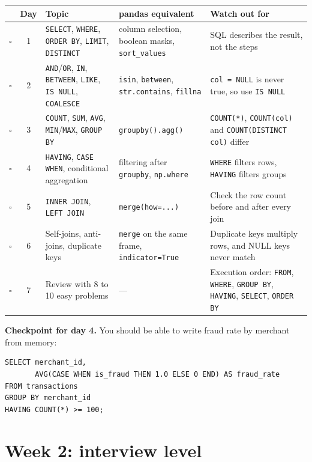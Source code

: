 \documentclass[11pt,a4paper]{article}
\newcommand{\code}[1]{\texttt{#1}}
\newcommand{\done}{$\square$}
\begin{document}
{\small
\begin{tabularx}{\textwidth}{@{}c c L L L@{}}
\toprule
 & \textbf{Day} & \textbf{Topic} & \textbf{pandas equivalent} & \textbf{Watch out for} \\
\midrule
\done & 1 & \code{SELECT}, \code{WHERE}, \code{ORDER BY}, \code{LIMIT}, \code{DISTINCT}
      & column selection, boolean masks, \code{sort\_values}
      & SQL describes the result, not the steps \\
\done & 2 & \code{AND}/\code{OR}, \code{IN}, \code{BETWEEN}, \code{LIKE}, \code{IS NULL}, \code{COALESCE}
      & \code{isin}, \code{between}, \code{str.contains}, \code{fillna}
      & \code{col = NULL} is never true, so use \code{IS NULL} \\
\done & 3 & \code{COUNT}, \code{SUM}, \code{AVG}, \code{MIN}/\code{MAX}, \code{GROUP BY}
      & \code{groupby().agg()}
      & \code{COUNT(*)}, \code{COUNT(col)} and \code{COUNT(DISTINCT col)} differ \\
\done & 4 & \code{HAVING}, \code{CASE WHEN}, conditional aggregation
      & filtering after \code{groupby}, \code{np.where}
      & \code{WHERE} filters rows, \code{HAVING} filters groups \\
\done & 5 & \code{INNER JOIN}, \code{LEFT JOIN}
      & \code{merge(how=...)}
      & Check the row count before and after every join \\
\done & 6 & Self-joins, anti-joins, duplicate keys
      & \code{merge} on the same frame, \code{indicator=True}
      & Duplicate keys multiply rows, and NULL keys never match \\
\done & 7 & Review with 8 to 10 easy problems
      & ---
      & Execution order: \code{FROM}, \code{WHERE}, \code{GROUP BY}, \code{HAVING}, \code{SELECT}, \code{ORDER BY} \\
\bottomrule
\end{tabularx}\par
}

\textbf{Checkpoint for day 4.} You should be able to write fraud rate by merchant from memory:

\begin{lstlisting}
SELECT merchant_id,
       AVG(CASE WHEN is_fraud THEN 1.0 ELSE 0 END) AS fraud_rate
FROM transactions
GROUP BY merchant_id
HAVING COUNT(*) >= 100;
\end{lstlisting}

\section{Week 2: interview level}
\end{document}
